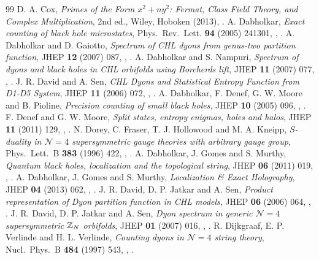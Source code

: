 \begin{thebibliography}{99}
 D. A. Cox, \emph{Primes of the Form $x^2+ny^2$: Fermat, Class Field Theory, and Complex Multiplication}, 2nd ed., Wiley, Hoboken (2013), .
 A. Dabholkar, \emph{Exact counting of black hole microstates}, Phys.\ Rev.\ Lett. \textbf{94} (2005) 241301, , .
 A. Dabholkar and D. Gaiotto, \emph{Spectrum of CHL dyons from genus-two partition function}, JHEP \textbf{12} (2007) 087, , .
 A. Dabholkar and S. Nampuri, \emph{Spectrum of dyons and black holes in CHL orbifolds using Borcherds lift}, JHEP \textbf{11} (2007) 077, , .
 J. R. David and A. Sen, \emph{CHL Dyons and Statistical Entropy Function from D1-D5 System}, JHEP \textbf{11} (2006) 072, , .
 A. Dabholkar, F. Denef, G. W. Moore and B. Pioline, \emph{Precision counting of small black holes}, JHEP \textbf{10} (2005) 096, , .
 F. Denef and G. W. Moore, \emph{Split states, entropy enigmas, holes and halos}, JHEP \textbf{11} (2011) 129, , .
 N. Dorey, C. Fraser, T. J. Hollowood and M. A. Kneipp, \emph{$S$-duality in $\mathcal N=4$ supersymmetric gauge theories with arbitrary gauge group}, Phys.\ Lett.\ B \textbf{383} (1996) 422, , .
 A. Dabholkar, J. Gomes and S. Murthy, \emph{Quantum black holes, localization and the topological string}, JHEP \textbf{06} (2011) 019, , .
 A. Dabholkar, J. Gomes and S. Murthy, \emph{Localization \& Exact Holography}, JHEP \textbf{04} (2013) 062, , .
 J. R. David, D. P. Jatkar and A. Sen, \emph{Product representation of Dyon partition function in CHL models}, JHEP \textbf{06} (2006) 064, , .
 J. R. David, D. P. Jatkar and A. Sen, \emph{Dyon spectrum in generic $\mathcal N=4$ supersymmetric $\mathbb{Z}_N$ orbifolds}, JHEP \textbf{01} (2007) 016, , .
 R. Dijkgraaf, E. P. Verlinde and H. L. Verlinde, \emph{Counting dyons in $\mathcal N=4$ string theory}, Nucl.\ Phys.\ B \textbf{484} (1997) 543, , .

\end{thebibliography}
